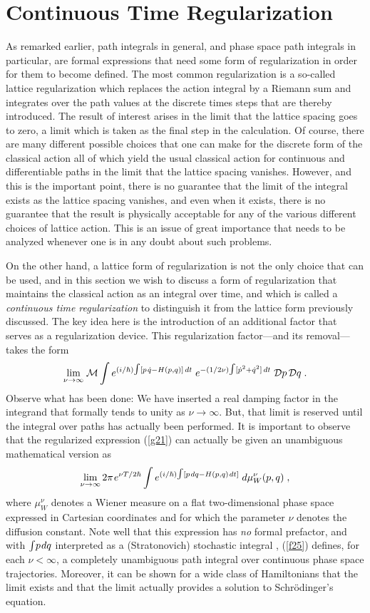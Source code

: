 \documentclass[12pt]{article}
\def\D{{\cal D}}
\def\ra{\rightarrow}
\def\tint{{\textstyle\int}}
\def\s{\hskip.08em}
\def\bn{\begin{eqnarray}}     %
\def\en{\end{eqnarray}}       %
\begin{document}
\section{Continuous Time Regularization}
As remarked earlier, path integrals in general, and phase space path 
integrals in particular, are formal expressions that need some form of 
regularization in order for them to become defined. The most common 
regularization is a so-called lattice regularization which replaces the 
action integral by a Riemann sum and integrates over the path values at 
the discrete times steps that are thereby introduced. The result of 
interest arises in the limit that the lattice spacing goes to zero, a 
limit which is taken as the final step in the calculation. Of course, 
there are many different possible choices that one can make for the discrete 
form of the classical action all of which yield the usual classical action 
for continuous and differentiable paths in the limit that the lattice 
spacing vanishes. However, and this is the important point, there is no 
guarantee that the limit of the integral exists as the lattice spacing 
vanishes, and even when it exists, there is no guarantee that the result 
is physically acceptable for any of the various different choices of 
lattice action. This is an issue of great importance that needs to be 
analyzed whenever one is in any doubt about such problems.

On the other hand, a lattice form of regularization is not the only choice 
that can be used, and in this section we wish to discuss a form of 
regularization that maintains the classical action as an integral over 
time, and which is called a {\it continuous time regularization} to 
distinguish it from the lattice form previously discussed. The key idea 
here is the introduction of an additional factor that serves as a 
regularization device. This regularization factor---and its removal---takes 
the form \cite{dau}
  \bn \lim_{\nu\ra\infty}\s{\cal M}\int e^{(i/\hbar)
\tint[p\s{\dot q}-H(p,q)]\,dt}\;
e^{-(1/2\nu)\tint[{\dot p}^2+{\dot q}^2]\,dt}\;\D p\,\D q\;.  \label{g21}\en
Observe what has been done: We have inserted a real damping factor in the 
integrand that formally tends to unity as $\nu\ra\infty$. But, that limit 
is reserved until the integral over paths has actually been performed. It 
is important to observe that the regularized expression (\ref{g21}) can 
actually be given an unambiguous mathematical version as
  \bn \lim_{\nu\ra\infty}2\pi\s e^{\nu T/2\hbar}\int 
e^{(i/\hbar)\tint[p\s dq-H(p,q)\s dt]}\;d\mu^\nu_W(p,q)\;, \label{f25}\en
where $\mu^\nu_W$ denotes a Wiener measure on a flat two-dimensional 
phase space expressed in Cartesian coordinates and for which the parameter 
$\nu$ denotes the diffusion constant. Note well that this expression 
has {\it no} formal prefactor, and with $\tint p\s dq$ interpreted as a 
(Stratonovich) stochastic integral \cite{jjj}, (\ref{f25}) defines, for 
each $\nu<\infty$, a completely unambiguous path integral over continuous 
phase space trajectories. Moreover, it can be shown \cite{dau} for a wide 
class of Hamiltonians that the limit exists and that the limit actually 
provides a solution to Schr\"odinger's equation.  
\end{document}

